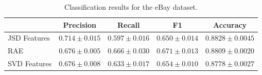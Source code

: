 \documentclass{article} %
\begin{document}
\begin{table}[t]
\caption{Classification results for the eBay dataset.}
\label{tab:classification-results}
\vspace{-4mm}
\begin{center}
\begin{tabular}{|l|c|c|c|c|}
\hline
&Precision & Recall & F1 & Accuracy
\\ \hline 
JSD Features         &$\mathbf{0.714}\pm 0.015$&$0.597\pm 0.016$&$0.650\pm
0.014$& $\mathbf{0.8828}\pm 0.0045$\\
RAE             &$0.676\pm 0.005$&$\mathbf{0.666}\pm 0.030$&$\mathbf{0.671}\pm
0.013$&$0.8809\pm 0.0020$ \\
SVD Features             &$0.676\pm 0.008$&$0.633\pm 0.017$&$0.654\pm
0.010$&$0.8778\pm 0.0027$\\
\hline
\end{tabular}
\end{center}
\end{table}










\end{document}
